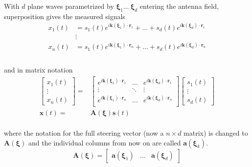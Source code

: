 \documentclass[11pt]{article}
\renewcommand{\vct}[1]{\boldsymbol{#1}}
\begin{document}
With $d$ plane waves parametrized by $\vct{\xi}_1 \dots\ \vct{\xi}_d$ entering the antenna field, superposition gives the measured signals
\begin{equation}
    \begin{split}
        x_1(t)& = s_1(t)e^{i{\vct{k}(\vct{\xi}_1)}\cdot{\vct{r}_1}} + \dots + s_d(t)e^{i{\vct{k}(\vct{\xi}_d)}\cdot{\vct{r}_1}}\\
        &\vdots\\
        x_n(t)& = s_1(t)e^{i{\vct{k}(\vct{\xi}_1)}\cdot{\vct{r}_n}} + \dots + s_d(t)e^{i{\vct{k}(\vct{\xi}_d)}\cdot{\vct{r}_n}}\\
    \end{split}
\end{equation}
\\and in matrix notation
\begin{equation} \label{eq:4}
\begin{split}
    \begin{bmatrix}
        x_1(t)\\
        \vdots\\
        x_n(t)
    \end{bmatrix}
    =&
    \begin{bmatrix}
        e^{i{\vct{k}(\vct{\xi}_1)}\cdot{\vct{r}_1}} & \dots & e^{i{\vct{k}(\vct{\xi}_d)}\cdot{\vct{r}_1}}\\
        \vdots & \ddots & \vdots\\
        e^{i{\vct{k}(\vct{\xi}_1)}\cdot{\vct{r}_n}} & \dots & e^{i{\vct{k}(\vct{\xi}_d)}\cdot{\vct{r}_n}}\\
    \end{bmatrix}
    \begin{bmatrix}
        s_1(t)\\
        \vdots\\
        s_d(t)
    \end{bmatrix}
    \\
    \vct{x}(t) =& \vct{A}(\vct{\xi})\vct{s}(t)\\
\end{split}
\end{equation}

where the notation for the full steering vector (now a $n\times d$ matrix) is changed to $\vct{A}(\vct{\xi})$ and the individual columns from now on are called $\vct{a}(\vct{\xi}_k)$.
\begin{equation}
    \vct{A}(\vct{\xi}) = \begin{bmatrix}\vct{a}(\vct{\xi}_1)&\dots&\vct{a}(\vct{\xi}_d)\end{bmatrix}
\end{equation}
\end{document}
